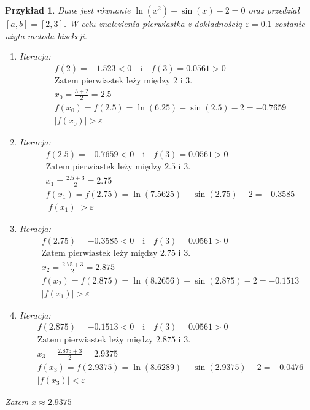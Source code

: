 \documentclass[12pt]{article}
\newtheorem{example}{Przykład}
\begin{document}
\begin{example}
Dane jest równanie $\ln(x^2) - \sin(x) - 2 = 0$ oraz przedział $[a, b] = [2,3]$.
W celu znalezienia pierwiastka z dokładnością $\varepsilon = 0.1$ zostanie użyta metoda bisekcji.

\begin{enumerate}
\item Iteracja:\\
\begin{align*}
&f(2)=-1.523<0 \quad \text{i} \quad f(3)=0.0561>0\\
&\text{Zatem pierwiastek leży między 2 i 3.}\\
&x_0=\frac{3+2}{2}=2.5\\
&f(x_0)=f(2.5)=\ln(6.25)-\sin(2.5)-2=-0.7659\\
&|f(x_0)|>\varepsilon
\end{align*}
    
    \item Iteracja:\\
\begin{align*}
    &f(2.5)=-0.7659<0 \quad \text{i} \quad f(3)=0.0561>0\\
    &\text{Zatem pierwiastek leży między 2.5 i 3.}\\
    &x_1=\frac{2.5+3}{2}=2.75\\
    &f(x_1)=f(2.75)=\ln(7.5625)-\sin(2.75)-2=-0.3585\\
    &|f(x_1)|>\varepsilon
\end{align*}

    
    \item Iteracja:\\
\begin{align*}
    &f(2.75)=-0.3585<0 \quad \text{i} \quad f(3)=0.0561>0\\
    &\text{Zatem pierwiastek leży między 2.75 i 3.}\\
    &x_2=\frac{2.75+3}{2}=2.875\\
    &f(x_2)=f(2.875)=\ln(8.2656)-\sin(2.875)-2=-0.1513\\
&|f(x_1)|>\varepsilon
\end{align*}
    
    \item Iteracja:\\
\begin{align*}
    &f(2.875)=-0.1513<0 \quad \text{i} \quad f(3)=0.0561>0\\
    &\text{Zatem pierwiastek leży między 2.875 i 3.}\\
    &x_3=\frac{2.875+3}{2}=2.9375\\
    &f(x_3)=f(2.9375)=\ln(8.6289)-\sin(2.9375)-2=-0.0476\\
    &|f(x_3)|<\varepsilon
\end{align*}
\end{enumerate}

Zatem $x \approx 2.9375$
\end{example}
\newpage
\end{document}
